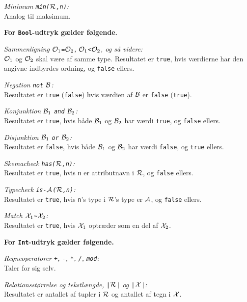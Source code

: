 \documentclass{article}
\newcounter{eks}
\begin{document}
{\em Minimum \verb"min("$\cal R$\verb",n)":}\\
Analog til maksimum.

{\bf For \verb"Bool"-udtryk g\ae{}lder f\o{}lgende.}

{\em Sammenligning ${\cal O}_1$\verb"="${\cal O}_2$, ${\cal O}_1$\verb"<"${\cal O}_2$, og s\aa{} videre:}\\
${\cal O}_1$ og ${\cal O}_2$ skal v\ae{}re af samme type. Resultatet er
\verb"true", hvis v\ae{}rdierne har den angivne indbyrdes ordning, og
\verb"false" ellers.

{\em Negation \verb"not" $\cal B$:}\\
Resultatet er \verb"true" (\verb"false") hvis v\ae{}rdien af 
$\cal B$ er \verb"false" (\verb"true").

{\em Konjunktion ${\cal B}_1$ \verb"and" ${\cal B}_2$:}\\
Resultatet er \verb"true", hvis b\aa{}de ${\cal B}_1$ og ${\cal B}_2$
har v\ae{}rdi \verb"true", og \verb"false" ellers.

{\em Disjunktion ${\cal B}_1$ \verb"or" ${\cal B}_2$:}\\
Resultatet er \verb"false", hvis b\aa{}de ${\cal B}_1$ og ${\cal B}_2$
har v\ae{}rdi \verb"false", og \verb"true" ellers.

{\em Skemacheck \verb"has("$\cal R$\verb",n)":}\\
Resultatet er \verb"true", hvis \verb"n" er attributnavn i $\cal R$,
og \verb"false" ellers.

{\em Typecheck \verb"is-"$\cal A$\verb"("$\cal R$\verb",n)":}\\
Resultatet er \verb"true", hvis \verb"n"'s type i $\cal R$'s type
er $\cal A$, og \verb"false" ellers.

{\em Match ${\cal X}_1$\verb"~"${\cal X}_2$:}\\
Resultatet er \verb"true", hvis ${\cal X}_1$ optr\ae{}der som en del af ${\cal
X}_2$.

{\bf For \verb"Int"-udtryk g\ae{}lder f\o{}lgende.}

{\em Regneoperatorer \verb"+", \verb"-", \verb"*", \verb"/", \verb"mod":}\\
Taler for sig selv.

{\em Relationsst\o{}rrelse og tekstl\ae{}ngde, \verb"|"$\cal R$\verb"|" og
\verb"|"$\cal X$\verb"|":}\\
Resultatet er antallet af tupler i $\cal R$ og antallet af tegn i
$\cal X$.
\end{document}
